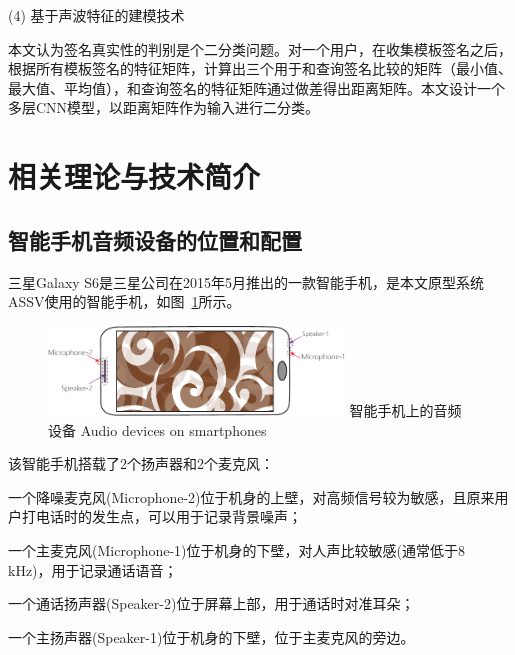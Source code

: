 (4) 基于声波特征的建模技术

本文认为签名真实性的判别是个二分类问题。对一个用户，在收集模板签名之后，根据所有模板签名的特征矩阵，计算出三个用于和查询签名比较的矩阵（最小值、最大值、平均值），和查询签名的特征矩阵通过做差得出距离矩阵。本文设计一个多层CNN模型，以距离矩阵作为输入进行二分类。

\section{相关理论与技术简介}

\subsection{智能手机音频设备的位置和配置}

三星Galaxy S6是三星公司在2015年5月推出的一款智能手机，是本文原型系统ASSV使用的智能手机，如图~\ref{fig:audio-device-smartphone}所示。
\begin{figure}[!htp]
  \centering
  \includegraphics[width=0.7\textwidth]{figure/smartphone.pdf}
  \bicaption
    {智能手机上的音频设备}
    {Audio devices on smartphones}
  \label{fig:audio-device-smartphone}
\end{figure}
该智能手机搭载了2个扬声器和2个麦克风：
\begin{enumerate*}[label=\alph*)]
    \item 一个降噪麦克风(Microphone-2)位于机身的上壁，对高频信号较为敏感，且原来用户打电话时的发生点，可以用于记录背景噪声；
    \item 一个主麦克风(Microphone-1)位于机身的下壁，对人声比较敏感(通常低于8 kHz)，用于记录通话语音；
    \item 一个通话扬声器(Speaker-2)位于屏幕上部，用于通话时对准耳朵；
    \item 一个主扬声器(Speaker-1)位于机身的下壁，位于主麦克风的旁边。
\end{enumerate*}

